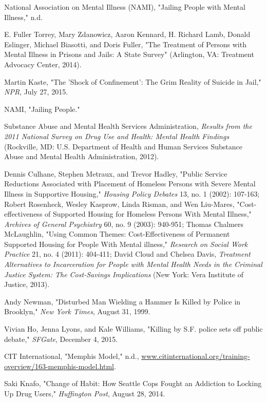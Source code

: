 \documentclass[fontset=fandol, a4paper, 12pt, openright]{ctexbook}
\begin{document}
\begin{enumerate}[label={[\arabic*]}]
    \item National Association on Mental Illness (NAMI), "Jailing People with Mental Illness," n.d.
    \item E. Fuller Torrey, Mary Zdanowicz, Aaron Kennard, H. Richard Lamb, Donald Eslinger, Michael Biasotti, and Doris Fuller, "The Treatment of Persons with Mental Illness in Prisons and Jails: A State Survey" (Arlington, VA: Treatment Advocacy Center, 2014).
    \item Martin Kaste, "The 'Shock of Confinement': The Grim Reality of Suicide in Jail," \textit{NPR}, July 27, 2015.
    \item NAMI, "Jailing People."
    \item Substance Abuse and Mental Health Services Administration, \textit{Results from the 2011 National Survey on Drug Use and Health: Mental Health Findings} (Rockville, MD: U.S. Department of Health and Human Services Substance Abuse and Mental Health Administration, 2012).
    \item Dennis Culhane, Stephen Metraux, and Trevor Hadley, "Public Service Reductions Associated with Placement of Homeless Persons with Severe Mental Illness in Supportive Housing," \textit{Housing Policy Debates} 13, no. 1 (2002): 107-163; Robert Rosenheck, Wesley Kasprow, Linda Risman, and Wen Liu-Mares, "Cost-effectiveness of Supported Housing for Homeless Persons With Mental Illness," \textit{Archives of General Psychiatry} 60, no. 9 (2003): 940-951; Thomas Chalmers McLaughlin, "Using Common Themes: Cost-Effectiveness of Permanent Supported Housing for People With Mental illness," \textit{Research on Social Work Practice} 21, no. 4 (2011): 404-411; David Cloud and Chelsea Davis, \textit{Treatment Alternatives to Incarceration for People with Mental Health Needs in the Criminal Justice System: The Cost-Savings Implications} (New York: Vera Institute of Justice, 2013).
    \item Andy Newman, "Disturbed Man Wielding a Hammer Is Killed by Police in Brooklyn," \textit{New York Times}, August 31, 1999.
    \item Vivian Ho, Jenna Lyons, and Kale Williams, "Killing by S.F. police sets off public debate," \textit{SFGate}, December 4, 2015.
    \item CIT International, "Memphis Model," n.d., \url{www.citinternational.org/training-overview/163-memphis-model.html}.
    \item Saki Knafo, "Change of Habit: How Seattle Cops Fought an Addiction to Locking Up Drug Users," \textit{Huffington Post}, August 28, 2014.

\end{enumerate}
\end{document}
